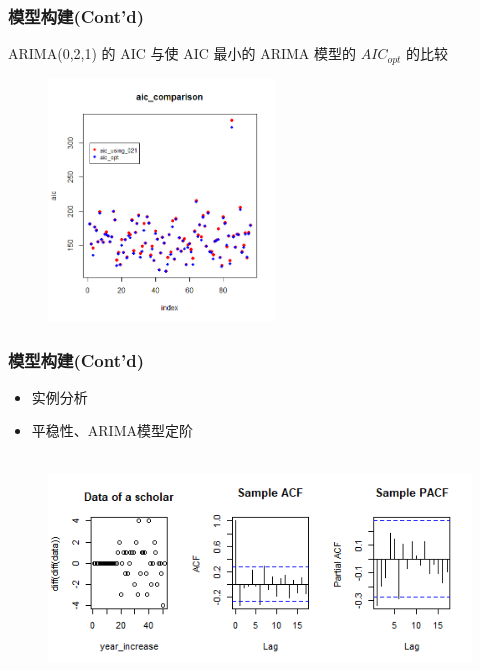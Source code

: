 \documentclass[11pt,compress,t, xcolor=table]{beamer}
\begin{document}
\begin{frame}
	\frametitle{模型构建(Cont'd)}
		\small{\textcolor{TsinghuaPurple}{ARIMA(0,2,1) 的 AIC }与\textcolor{TsinghuaPurple}{使 AIC 最小的 ARIMA 模型的 $AIC_{opt}$ }的比较}

		\begin{figure}[H]
			\footnotesize
			\centering
			\includegraphics[width=6cm]{image/aic.png}
		\end{figure}
	
\end{frame}

\begin{frame}
	\frametitle{模型构建(Cont'd)}
	\begin{itemize}	
		\item 实例分析
		\smallskip	
		\item 平稳性、ARIMA模型定阶
	\end{itemize}
		
	\begin{figure}[H]
		\footnotesize
		\centering
		\includegraphics[width=11.5cm,height=6cm]{image/sample_scholar.png}
	\end{figure}
	
\end{frame}
\end{document}
